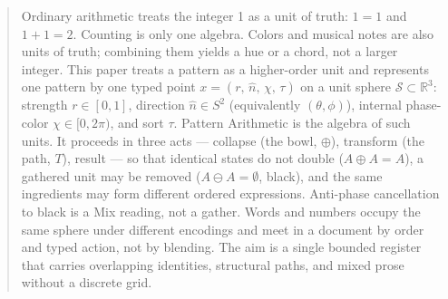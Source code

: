 \documentclass[12pt, a4paper]{article}
\begin{document}
%
%

\begin{abstract}
Ordinary arithmetic treats the integer 1 as a unit of truth: $1=1$ and $1+1=2$. Counting is only one algebra. Colors and musical notes are also units of truth; combining them yields a hue or a chord, not a larger integer. This paper treats a pattern as a higher-order unit and represents one pattern by one typed point
$x = (r,\,\hat n,\,\chi,\,\tau)$
on a unit sphere $\mathcal{S} \subset \mathbb{R}^3$:
strength $r \in [0, 1]$,
direction $\hat n \in S^2$ (equivalently $(\theta,\phi)$),
internal phase-color $\chi \in [0, 2\pi)$,
and sort $\tau$.
Pattern Arithmetic is the algebra of such units. It proceeds in three acts --- collapse (the bowl, $\oplus$), transform (the path, $T$), result --- so that identical states do not double ($A \oplus A = A$), a gathered unit may be removed ($A \ominus A = \emptyset$, black), and the same ingredients may form different ordered expressions. Anti-phase cancellation to black is a Mix reading, not a gather. Words and numbers occupy the same sphere under different encodings and meet in a document by order and typed action, not by blending. The aim is a single bounded register that carries overlapping identities, structural paths, and mixed prose without a discrete grid.
\end{abstract}
\end{document}

